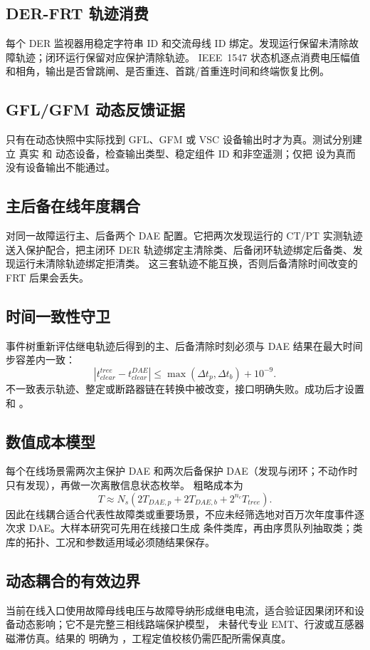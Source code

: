 \subsection{DER-FRT 轨迹消费}
每个 DER 监视器用稳定字符串 ID 和交流母线 ID 绑定。发现运行保留未清除故障轨迹；闭环运行保留对应保护清除轨迹。
IEEE~1547 状态机逐点消费电压幅值和相角，输出是否曾跳闸、是否重连、首跳/首重连时间和终端恢复比例。

\subsection{GFL/GFM 动态反馈证据}
 只有在动态快照中实际找到 GFL、GFM 或 VSC 设备输出时才为真。测试分别建立
真实  和  动态设备，检查输出类型、稳定组件 ID 和非空遥测；仅把
 设为真而没有设备输出不能通过。

\subsection{主后备在线年度耦合}
 对同一故障运行主、后备两个 DAE 配置。它把两次发现运行的
CT/PT 实测轨迹送入保护配合，把主闭环 DER 轨迹绑定主清除类、后备闭环轨迹绑定后备类、发现运行未清除轨迹绑定拒清类。
这三套轨迹不能互换，否则后备清除时间改变的 FRT 后果会丢失。

\subsection{时间一致性守卫}
事件树重新评估继电轨迹后得到的主、后备清除时刻必须与 DAE 结果在最大时间步容差内一致：
\begin{equation}
 |t_{clear}^{tree}-t_{clear}^{DAE}|\le\max(\Delta t_p,\Delta t_b)+10^{-9}.
\end{equation}
不一致表示轨迹、整定或断路器链在转换中被改变，接口明确失败。成功后才设置
 和 。

\subsection{数值成本模型}
每个在线场景需两次主保护 DAE 和两次后备保护 DAE（发现与闭环；不动作时只有发现），再做一次离散信息状态枚举。
粗略成本为
\begin{equation}
 T\approx N_s(2T_{DAE,p}+2T_{DAE,b}+2^{n_c}T_{tree}).
\end{equation}
因此在线耦合适合代表性故障类或重要场景，不应未经筛选地对百万次年度事件逐次求 DAE。大样本研究可先用在线接口生成
条件类库，再由序贯队列抽取类；类库的拓扑、工况和参数适用域必须随结果保存。

\subsection{动态耦合的有效边界}
当前在线入口使用故障母线电压与故障导纳形成继电电流，适合验证因果闭环和设备动态影响；它不是完整三相线路端保护模型，
未替代专业 EMT、行波或互感器磁滞仿真。结果的  明确为
，工程定值校核仍需匹配所需保真度。
